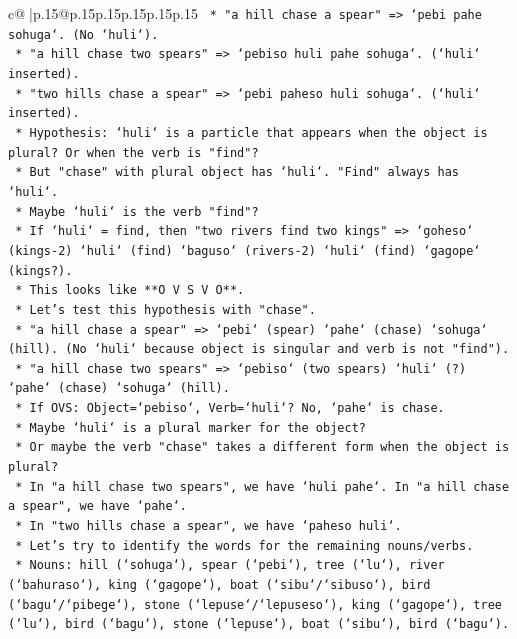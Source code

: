 \documentclass{article}
\begin{document}
{\begin{supertabular}{c@{$\;$}|p{.15\linewidth}@{}p{.15\linewidth}p{.15\linewidth}p{.15\linewidth}p{.15\linewidth}p{.15\linewidth}}
{{{\texttt{            *   "a hill chase a spear" => `pebi pahe sohuga`. (No `huli`).} \\
\texttt{            *   "a hill chase two spears" => `pebiso huli pahe sohuga`. (`huli` inserted).} \\
\texttt{            *   "two hills chase a spear" => `pebi paheso huli sohuga`. (`huli` inserted).} \\
\texttt{        *   Hypothesis: `huli` is a particle that appears when the object is plural? Or when the verb is "find"?} \\
\texttt{        *   But "chase" with plural object has `huli`. "Find" always has `huli`.} \\
\texttt{        *   Maybe `huli` is the verb "find"?} \\
\texttt{        *   If `huli` = find, then "two rivers find two kings" => `goheso` (kings{-}2) `huli` (find) `baguso` (rivers{-}2) `huli` (find) `gagope` (kings?).} \\
\texttt{        *   This looks like **O V S V O**.} \\
\texttt{        *   Let's test this hypothesis with "chase".} \\
\texttt{        *   "a hill chase a spear" => `pebi` (spear) `pahe` (chase) `sohuga` (hill). (No `huli` because object is singular and verb is not "find").} \\
\texttt{        *   "a hill chase two spears" => `pebiso` (two spears) `huli` (?) `pahe` (chase) `sohuga` (hill).} \\
\texttt{            *   If OVS: Object=`pebiso`, Verb=`huli`? No, `pahe` is chase.} \\
\texttt{            *   Maybe `huli` is a plural marker for the object?} \\
\texttt{            *   Or maybe the verb "chase" takes a different form when the object is plural?} \\
\texttt{            *   In "a hill chase two spears", we have `huli pahe`. In "a hill chase a spear", we have `pahe`.} \\
\texttt{            *   In "two hills chase a spear", we have `paheso huli`.} \\
\texttt{        *   Let's try to identify the words for the remaining nouns/verbs.} \\
\texttt{        *   Nouns: hill (`sohuga`), spear (`pebi`), tree (`lu`), river (`bahuraso`), king (`gagope`), boat (`sibu`/`sibuso`), bird (`bagu`/`pibege`), stone (`lepuse`/`lepuseso`), king (`gagope`), tree (`lu`), bird (`bagu`), stone (`lepuse`), boat (`sibu`), bird (`bagu`).} \\
}}}
\end{supertabular}}
\end{document}
